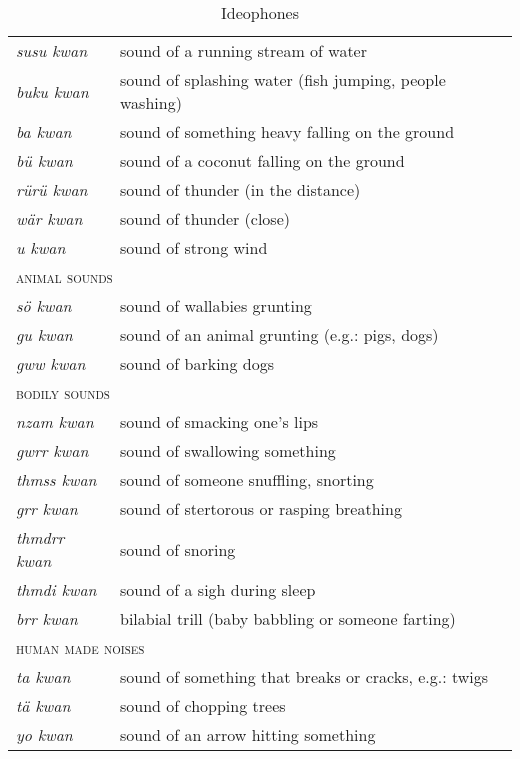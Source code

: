 {\renewcommand{\tabcolsep}{4pt}
\begin{table}
	\caption{Ideophones}
	\label{kwan-words}%
	\begin{tabular}{ll}
		\lsptoprule
		\multicolumn{2}{l}{\textsc{sounds from nature}}\\ \midrule
		\emph{susu kwan}&sound of a running stream of water\\
		\emph{buku kwan}&sound of splashing water (fish jumping, people washing)\\
		\emph{ba kwan}&sound of something heavy falling on the ground\\
		\emph{bü kwan}&sound of a coconut falling on the ground\\
		\emph{rürü kwan}&sound of thunder (in the distance)\\
		\emph{wär kwan}&sound of thunder (close)\\
		\emph{u kwan}&sound of strong wind\\
		\multicolumn{2}{l}{\textsc{animal sounds}}\\ \midrule
		\emph{sö kwan}&sound of wallabies grunting\\
		\emph{gu kwan}&sound of an animal grunting (e.g.: pigs, dogs)\\
		\emph{gww kwan}&sound of barking dogs\\
		\multicolumn{2}{l}{\textsc{bodily sounds}}\\ \midrule
		\emph{nzam kwan}&sound of smacking one's lips\\
		\emph{gwrr kwan}&sound of swallowing something\\
		\emph{thmss kwan}&sound of someone snuffling, snorting\\
		\emph{grr kwan}&sound of stertorous or rasping breathing\\
		\emph{thmdrr kwan}&sound of snoring\\
		\emph{thmdi kwan}&sound of a sigh during sleep\\
		\emph{brr kwan}&bilabial trill (baby babbling or someone farting)\\
		\multicolumn{2}{l}{\textsc{human made noises}}\\ \midrule
		\emph{ta kwan}&sound of something that breaks or cracks, e.g.: twigs\\
		\emph{tä kwan}&sound of chopping trees\\
		\emph{yo kwan}&sound of an arrow hitting something\\

\end{tabular}
\end{table}}
